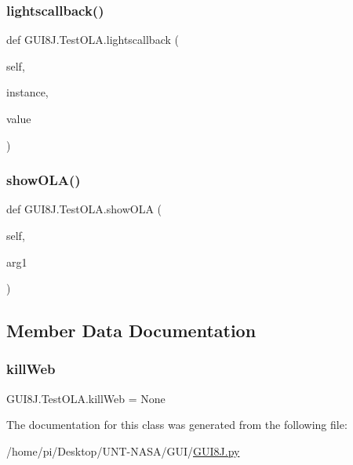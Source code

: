\mbox{\label{classGUI8J_1_1TestOLA_a12ec5bfda2ba9d420761f94685749f71}} 
\subsubsection{\texorpdfstring{lightscallback()}{lightscallback()}}
{\footnotesize\ttfamily def G\+U\+I8\+J.\+Test\+O\+L\+A.\+lightscallback (\begin{DoxyParamCaption}\item[{}]{self,  }\item[{}]{instance,  }\item[{}]{value }\end{DoxyParamCaption})}

\mbox{\label{classGUI8J_1_1TestOLA_aee815c8adc3e28174c670bc78d2c3efe}} 
\subsubsection{\texorpdfstring{show\+O\+L\+A()}{showOLA()}}
{\footnotesize\ttfamily def G\+U\+I8\+J.\+Test\+O\+L\+A.\+show\+O\+LA (\begin{DoxyParamCaption}\item[{}]{self,  }\item[{}]{arg1 }\end{DoxyParamCaption})}



\subsection{Member Data Documentation}
\mbox{\label{classGUI8J_1_1TestOLA_ab8bbf2f1542fc9201f45d02b43e40ee3}} 
\subsubsection{\texorpdfstring{kill\+Web}{killWeb}}
{\footnotesize\ttfamily G\+U\+I8\+J.\+Test\+O\+L\+A.\+kill\+Web = None\hspace{0.3cm}{\ttfamily [static]}}



The documentation for this class was generated from the following file\+:\begin{DoxyCompactItemize}
\item 
/home/pi/\+Desktop/\+U\+N\+T-\/\+N\+A\+S\+A/\+G\+U\+I/\hyperlink{GUI8J_8py}{G\+U\+I8\+J.\+py}\end{DoxyCompactItemize}
